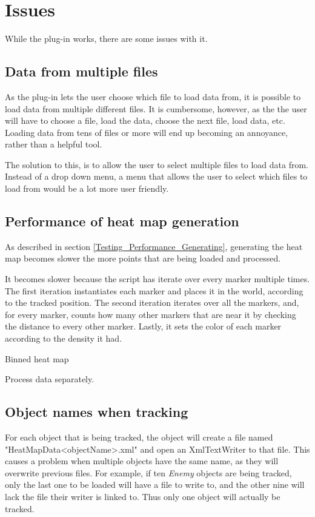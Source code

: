 \section{Issues}
\label{Issues}

While the plug-in works, there are some issues with it.

\subsection{Data from multiple files}
\label{Issues_MoreFiles}

As the plug-in lets the user choose which file to load data from, it is possible to load data from multiple different files. It is cumbersome, however, as the the user will have to choose a file, load the data, choose the next file, load data, etc. Loading data from tens of files or more will end up becoming an annoyance, rather than a helpful tool.

The solution to this, is to allow the user to select multiple files to load data from. Instead of a drop down menu, a menu that allows the user to select which files to load from would be a lot more user friendly.

\subsection{Performance of heat map generation}
\label{Issues_GenerationPerformance}

As described in section \ref{Testing_Performance_Generating}, generating the heat map becomes slower the more points that are being loaded and processed. 

It becomes slower because the script has iterate over every marker multiple times. The first iteration instantiates each marker and places it in the world, according to the tracked position. The second iteration iterates over all the markers, and, for every marker, counts how many other markers that are near it by checking the distance to every other marker. Lastly, it sets the color of each marker according to the density it had.

Binned heat map

Process data separately.

\subsection{Object names when tracking}
\label{Issues_UniqueNames}

For each object that is being tracked, the object will create a file named "HeatMapData<objectName>.xml" and open an XmlTextWriter to that file. This causes a problem when multiple objects have the same name, as they will overwrite previous files. For example, if ten \textit{Enemy} objects are being tracked, only the last one to be loaded will have a file to write to, and the other nine will lack the file their writer is linked to. Thus only one object will actually be tracked.

